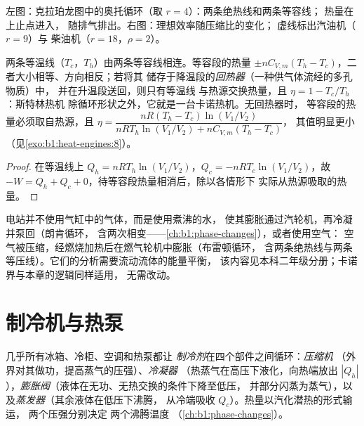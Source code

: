 \begin{omfigure}
{\small 左图：克拉珀龙图中的奥托循环（取 $r = 4$）：两条绝热线和两条等容线；
热量在上止点进入，
随排气排出。右图：理想效率随压缩比的变化；
虚线标出汽油机（$r = 9$）与
柴油机（$r = 18$，$\rho = 2$）。}
\end{omfigure}

\begin{proposition}[斯特林循环与回热器]\label{prop:b1:heat-engines:stirling}
两条等温线（$T_c$，$T_h$）由两条等容线相连。等容段的热量
$\pm nC_{V,m}(T_h - T_c)$，二者大小相等、方向相反；若将其
储存于降温段的\emph{回热器}（一种供气体流经的多孔物质）中，
并在升温段送回，则只有等温线
与热源交换热量，且 $\eta = 1 - T_c/T_h$：斯特林热机
除循环形状之外，它就是一台卡诺热机。无回热器时，
等容段的热量必须取自热源，且
$\eta = \dfrac{nR(T_h - T_c)\ln(V_1/V_2)}{nRT_h\ln(V_1/V_2) + nC_{V,m}(T_h - T_c)}$，
其值明显更小（见\cref{exo:b1:heat-engines:8}）。
\end{proposition}

\begin{proof}
在等温线上 $Q_h = nRT_h\ln(V_1/V_2)$，$Q_c = -nRT_c\ln(V_1/V_2)$，故
$-W = Q_h + Q_c + 0$，待等容段热量相消后，除以各情形下
实际从热源吸取的热量。
\end{proof}

\begin{remark}[蒸汽轮机与燃气轮机]\label{rem:b1:heat-engines:turbines}
电站并不使用气缸中的气体，而是使用煮沸的水，
使其膨胀通过汽轮机，再冷凝并泵回（朗肯循环，
含两次相变——\cref{ch:b1:phase-changes}），或者使用空气：
空气被压缩，经燃烧加热后在燃气轮机中膨胀（布雷顿循环，
含两条绝热线与两条等压线）。它们的分析需要流动流体的能量平衡，
该内容见本科二年级分册；卡诺界与本章的逻辑同样适用，
无需改动。
\end{remark}

\section{制冷机与热泵}

\begin{definition}[蒸气压缩循环]\label{def:b1:heat-engines:vapourcycle}
几乎所有冰箱、冷柜、空调和热泵都让
\emph{制冷剂}在四个部件之间循环：\emph{压缩机}
（外界对其做功，提高蒸气的压强）、\emph{冷凝器}
（热蒸气在高压下液化，向热端放出
$|Q_h|$），\emph{膨胀阀}（液体在无功、无热交换的条件下降至低压，
并部分闪蒸为蒸气），以及\emph{蒸发器}（其余液体在低压下沸腾，
从冷端吸收 $Q_c$）。热量以汽化潜热的形式输运，
两个压强分别决定
两个沸腾温度
（\cref{ch:b1:phase-changes}）。
\end{definition}

